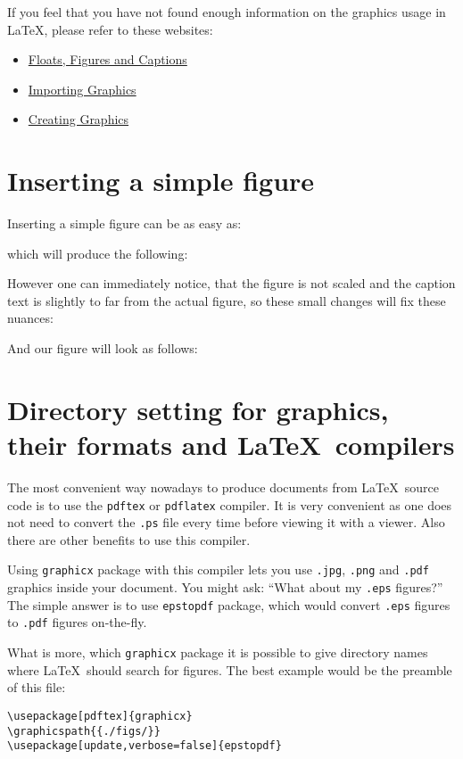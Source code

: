 If you feel that you have not found enough information on the graphics usage in
\LaTeX, please refer to these websites:
\begin{itemize}
    \item
        \href{https://secure.wikimedia.org/wikibooks/en/wiki/LaTeX/Floats,_Figures_and_Captions}{Floats,
        Figures and Captions}
    \item
        \href{https://secure.wikimedia.org/wikibooks/en/wiki/LaTeX/Importing_Graphics}{Importing
        Graphics}
    \item
        \href{https://secure.wikimedia.org/wikibooks/en/wiki/LaTeX/Creating_Graphics}{Creating
        Graphics}
\end{itemize}

\clearpage
\section{Inserting a simple figure}

Inserting a simple figure can be as easy as:

which will produce the following:


However one can immediately notice, that the figure is not scaled and the
caption text is slightly to far from the actual figure, so these small changes
will fix these nuances:

And our figure will look as follows:


\clearpage
\section{Directory setting for graphics, their formats and \LaTeX\ compilers}

The most convenient way nowadays to produce documents from \LaTeX\ source code
is to use the \verb|pdftex| or \verb|pdflatex| compiler. It is very convenient
as one does not need to convert the \verb|.ps| file every time before viewing it
with a viewer. Also there are other benefits to use this compiler.

Using \verb|graphicx| package with this compiler lets you use \verb|.jpg|,
\verb|.png| and \verb|.pdf| graphics inside your document. You might ask:
``What about my \verb|.eps| figures?'' The simple answer is to use
\verb|epstopdf| package, which would convert \verb|.eps| figures to \verb|.pdf|
figures on-the-fly.

What is more, which \verb|graphicx| package it is possible to give directory
names where \LaTeX\ should search for figures. The best example would be the
preamble of this file:
\begin{lstlisting}
\usepackage[pdftex]{graphicx}
\graphicspath{{./figs/}}
\usepackage[update,verbose=false]{epstopdf}
\end{lstlisting}

